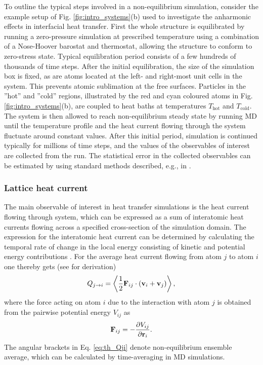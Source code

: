 To outline the typical steps involved in a non-equilibrium simulation, consider the example setup of Fig. \ref{fig:intro_systems}(b) used to investigate the anharmonic effects in interfacial heat transfer. First the whole structure is equilibrated by running a zero-pressure simulation at prescribed temperature using a combination of a Nose-Hoover barostat and thermostat, allowing the structure to conform to zero-stress state. Typical equilibration period consists of a few hundreds of thousands of time steps. After the initial equilibration, the size of the simulation box is fixed, as are atoms located at the left- and right-most unit cells in the system. This prevents atomic sublimation at the free surfaces. Particles in the ''hot'' and ''cold'' regions, illustrated by the red and cyan coloured atoms in Fig. \ref{fig:intro_systems}(b), are coupled to heat baths at temperatures $T_{\textrm{hot}}$ and $T_{\textrm{cold}}$. The system is then allowed to reach non-equilibrium steady state by running MD until the temperature profile and the heat current flowing through the system fluctuate around constant values. After this initial period, simulation is continued typically for millions of time steps, and the values of the observables of interest are collected from the run. The statistical error in the collected observables can be estimated by using standard methods described, e.g., in .



\subsubsection{Lattice heat current}
\label{sec:spectral}
The main observable of interest in heat transfer simulations is the heat current flowing through system, which can be expressed as a sum of interatomic heat currents flowing across a specified cross-section of the simulation domain. The expression for the interatomic heat current can be determined by calculating the temporal rate of change in the local energy consisting of kinetic and potential energy contributions \cite{hardy63,lepri03}. For the average heat current flowing from atom $j$ to atom $i$ one thereby gets (see  for derivation) 
\begin{equation}
 Q_{j\to i} = \left\langle \frac{1}{2} \mathbf{F}_{ij} \cdot \left( \mathbf{v}_i+\mathbf{v}_j \right) \right\rangle, \label{eq:th_Qji}
\end{equation}
where the force acting on atom $i$ due to the interaction with atom $j$ is obtained from the pairwise potential energy $V_{ij}$ as
\begin{equation}
 \mathbf{F}_{ij} = - \frac{\partial V_{ij}}{\partial \mathbf{r}_i}.
\end{equation}
The angular brackets in Eq. \eqref{eq:th_Qji} denote non-equilibrium ensemble average, which can be calculated by time-averaging in MD simulations. 

